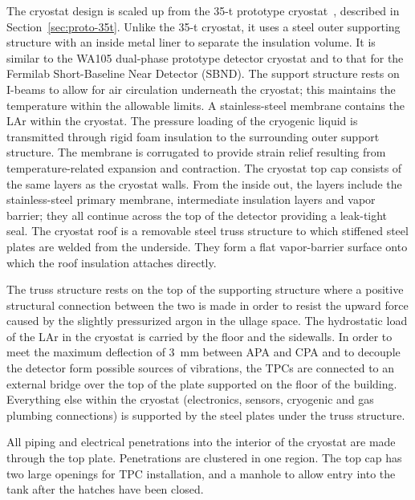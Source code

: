 The cryostat design is scaled up from the 35-t prototype
cryostat~\cite{montanari_35ton}, described in
Section~\ref{sec:proto-35t}.  Unlike the 35-t cryostat, it uses a
steel outer supporting structure with an inside metal liner to
separate the insulation volume. 
It is similar to the WA105 dual-phase prototype detector cryostat and to that for the Fermilab Short-Baseline Near Detector (SBND). 
The support structure rests on I-beams to allow for air circulation
underneath the cryostat; this maintains the temperature within the
allowable limits.  A stainless-steel membrane contains the LAr within
the cryostat. The pressure loading of the cryogenic liquid is
transmitted through rigid foam insulation to the surrounding outer
support structure. The membrane is corrugated to provide strain relief
resulting from temperature-related expansion and contraction. The
cryostat top cap consists of the same layers as the cryostat walls.
%
From the inside out, the layers include the stainless-steel primary
membrane, intermediate insulation layers and vapor barrier; they all
continue across the top of the detector providing a
leak-tight seal.  The cryostat roof is a removable steel truss
structure to which stiffened steel plates are welded from the
underside. They form a flat vapor-barrier surface onto which the roof
insulation attaches directly.


The truss structure rests on the top of the supporting structure where
a positive structural connection between the two is made in order to
resist the upward force caused by the slightly pressurized argon in
the ullage space. The hydrostatic load of the LAr in the cryostat is
carried by the floor and the sidewalls. In order to meet the maximum
deflection of 3~mm between APA and CPA and to decouple the detector
form possible sources of vibrations, the TPCs are connected to an
external bridge over the top of the plate supported on the floor of
the building. Everything else within the cryostat (electronics,
sensors, cryogenic and gas plumbing connections) is supported by the
steel plates under the truss structure.

All piping and electrical penetrations into the interior of the
cryostat are made through the top plate.  Penetrations are clustered
in one region.  The top cap has two large openings for TPC
installation, and a manhole to allow entry into the tank after the
hatches have been closed.

